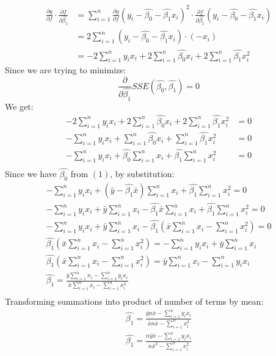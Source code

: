 \documentclass{article}
\begin{document}
\begin{align*}
\frac{\partial g}{\partial f}\cdot\frac{\partial f} {\partial \hat{\beta_1}} & = 
\sum_{i=1}^{n} \frac{\partial g}{\partial f} (y_i - \hat{\beta_{0}} - \hat{\beta_{1}}x_i)^2 \cdot \frac{\partial f} {\partial \hat{\beta_1}} (y_i - \hat{\beta_{0}} - \hat{\beta_{1}}x_i) \\
& = 2 \sum_{i=1}^{n} (y_i - \hat{\beta_{0}} - \hat{\beta_{1}}x_i) \cdot 
(-x_i) \\
& =  -2\sum_{i=1}^{n}y_i x_i + 2\sum_{i=1}^{n}\hat{\beta_{0}}x_i + 2\sum_{i=1}^{n}\hat{\beta_{1}}x_i^2
\end{align*}
Since we are trying to minimize:
$$
\frac{\partial}{\partial \hat{\beta_1}}SSE(\hat{\beta_0}, \hat{\beta_1}) = 0
$$
We get:
\begin{align*}
-2\sum_{i=1}^{n}y_i x_i + 2\sum_{i=1}^{n}\hat{\beta_{0}}x_i + 2\sum_{i=1}^{n}\hat{\beta_{1}}x_i^2 & = 0 \\
-\sum_{i=1}^{n}y_i x_i + \sum_{i=1}^{n}\hat{\beta_{0}}x_i + \sum_{i=1}^{n}\hat{\beta_{1}}x_i^2 & = 0 \\
-\sum_{i=1}^{n}y_i x_i + \hat{\beta_{0}}\sum_{i=1}^{n}x_i + \hat{\beta_{1}} \sum_{i=1}^{n}x_i^2 & = 0 \\
\end{align*}
Since we have $\hat{\beta_0}$ from $(1)$, by substitution:
\begin{gather*}
-\sum_{i=1}^{n}y_i x_i + (\bar{y} - \hat{\beta_1}\bar{x})\sum_{i=1}^{n}x_i + \hat{\beta_{1}} \sum_{i=1}^{n}x_i^2  = 0 \\
-\sum_{i=1}^{n}y_i x_i + \bar{y}\sum_{i=1}^{n}x_i - \hat{\beta_1}\bar{x}\sum_{i=1}^{n}x_i + \hat{\beta_{1}} \sum_{i=1}^{n}x_i^2  = 0 \\
-\sum_{i=1}^{n}y_i x_i + \bar{y}\sum_{i=1}^{n}x_i - \hat{\beta_1}(\bar{x}\sum_{i=1}^{n}x_i - \sum_{i=1}^{n}x_i^2)  = 0 \\
\hat{\beta_1}(\bar{x}\sum_{i=1}^{n}x_i - \sum_{i=1}^{n}x_i^2) = -\sum_{i=1}^{n}y_i x_i + \bar{y}\sum_{i=1}^{n}x_i \\
\hat{\beta_1}(\bar{x}\sum_{i=1}^{n}x_i - \sum_{i=1}^{n}x_i^2) =  \bar{y}\sum_{i=1}^{n}x_i 
- \sum_{i=1}^{n}y_i x_i \\
\hat{\beta_1}=  \frac{\bar{y}\sum_{i=1}^{n}x_i 
- \sum_{i=1}^{n}y_i x_i}{\bar{x}\sum_{i=1}^{n}x_i - \sum_{i=1}^{n}x_i^2}  \\
\end{gather*}
Transforming summations into product of number of terms by mean:
\begin{gather*}
\hat{\beta_1}=  \frac{\bar{y}n\bar{x} 
- \sum_{i=1}^{n}y_i x_i}{\bar{x}n\bar{x} - \sum_{i=1}^{n}x_i^2}  \\
\hat{\beta_1}=  \frac{n\bar{y}\bar{x} 
- \sum_{i=1}^{n}y_i x_i}{n\bar{x}^2 - \sum_{i=1}^{n}x_i^2}
\end{gather*}
\end{document}
